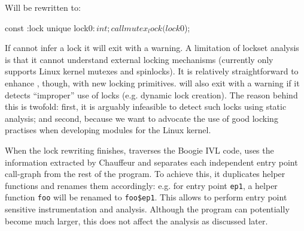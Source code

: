 
Will be rewritten to:

\begin{boogie}
const {:lock} unique lock$0: int;

call mutex_lock(lock$0);
\end{boogie}

If \whoop cannot infer a lock it will exit with a warning. A limitation of lockset analysis is that it cannot understand external locking mechanisms (\whoop currently only supports Linux kernel mutexes and spinlocks). It is relatively straightforward to enhance \whoop, though, with new locking primitives. \whoop will also exit with a warning if it detects ``improper'' use of locks (e.g. dynamic lock creation). The reason behind this is twofold: first, it is arguably infeasible to detect such locks using static analysis; and second, because we want to advocate the use of good locking practises when developing modules for the Linux kernel.

When the lock rewriting finishes, \whoop traverses the Boogie IVL code, uses the information extracted by Chauffeur and separates each independent entry point call-graph from the rest of the program. To achieve this, it duplicates helper functions and renames them accordingly: e.g. for entry point \texttt{ep1}, a helper function \texttt{foo} will be renamed to \texttt{foo\$ep1}. This allows \whoop to perform entry point sensitive instrumentation and analysis. Although the program can potentially become much larger, this does not affect the analysis as discussed later.





